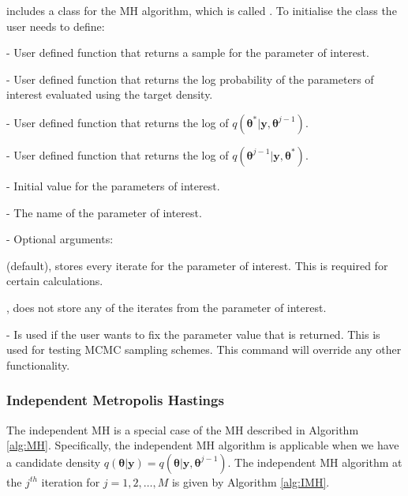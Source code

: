 \documentclass[article]{jss}
\begin{document}
 includes a class for the MH algorithm, which is called
.  To initialise the class the user needs to define:
\begin{description} 
\item {} - User defined function that returns a sample for
  the parameter of interest.
\item {} - User defined function that returns the log
  probability of the parameters of interest evaluated using the target
  density.
\item {} - User defined function that returns the log
  of $q\left(\bm{\theta}^{\ast}|\bm{y},\bm{\theta}^{j-1}\right).$
\item {} - User defined function that returns the log
  of $q\left(\bm{\theta}^{j-1}|\bm{y},\bm{\theta}^{*}\right).$
\item {} - Initial value for the parameters of
  interest.
\item {} - The name of the parameter of interest.
\item {} - Optional arguments:

  \begin{description}
  \item {}
    \begin{description}  
    \item {} (default), stores every iterate for the parameter
      of interest. This is required for certain calculations.
    \item {}, does not store any of the iterates from the parameter of
      interest.
    \end{description}
  \item {} - Is used if the user wants to fix the
    parameter value that is returned. This is used for testing MCMC
    sampling schemes.  This command will override any other
    functionality.
  \end{description}
\end{description}
\subsubsection{Independent Metropolis Hastings}

The independent MH is a special case of the MH 
described in Algorithm \ref{alg:MH}. Specifically, the
independent MH algorithm is applicable when we have a candidate
density
$q(\bm{\theta}|\bm{y})=q(\bm{\theta}|\bm{y},\bm{\theta}^{j-1})$.  The
independent MH algorithm at the $j^{th}$ iteration for
$j=1,2,\ldots,M$ is given by Algorithm \ref{alg:IMH}.
\end{document}
